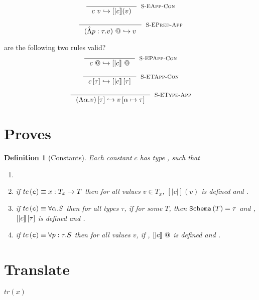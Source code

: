 \documentclass[10pt,a4paper]{article}
\newcommand\highlight[2]{{\setlength\fboxsep{1pt}\colorbox{#1}{#2}}}
\def\NV{\highlight{colorNV}}
\newtheorem{definition}{Definition}
\newcommand\trans[1]{\ensuremath{tr (#1)}}
\newcommand\rulename[1]{\textsc{#1}}
\newcommand\eval[2]{\ensuremath{#1 \hookrightarrow #2 }}
\begin{document}
$$
\inference{
}{
	\eval{\eapp{c}{v}}{[|c|](v)}
}[\rulename{S-EApp-Con}]
$$

$$
\inference{
}{
	\eval{\epapp{(\epabs{p}{\tau}{v})}}{v}
}[\rulename{S-EPred-App}]
$$

\NV{are the following two rules valid?}
$$
\inference{
}{
	\eval{\epapp{c}}{\epapp{[|c|]}}
}[\rulename{S-EPApp-Con}]
$$

$$
\inference{
}{
	\eval{\etapp{c}{\tau}}{\etapp{[|c|]}{\tau}}
}[\rulename{S-ETApp-Con}]
$$

$$
\inference{
}{
	\eval{\etapp{(\etabs{\alpha}{v})}{\tau}}{v\sub{\alpha}{\tau}}
}[\rulename{S-EType-App}]
$$


\begin{comment}


\end{comment}
\section*{Proves}

\begin{definition}[Constants]
\label{DefConstants}
Each constant $c$ has type , such that
\begin{enumerate}
\item {}
\item if $tc\left(\texttt{c}\right) \equiv x : T_x \rightarrow T$
	  then for all values $v \in T_x$, 
	  $[|c|](v)$ is defined and 
	  .
\item if $tc\left(\texttt{c}\right) \equiv \forall \alpha . S$
	  then for all types $\tau$, 
	  if for some $T$, then 
	  $\texttt{Schema}\left(T\right) = \tau$ and , 
	  ${[|c|]} \left[ {\tau}\right]$ is defined and 
	  .
\item if $tc\left(\texttt{c}\right) \equiv \forall p : \tau . S$
	  then for all values $v$, 
	  if ,
	  ${[|c|]} \ @$ is defined and 
	  .
\end{enumerate}
\end{definition}



\section*{Translate}
\vfill\vbox{\trans{x}}
\end{document}
